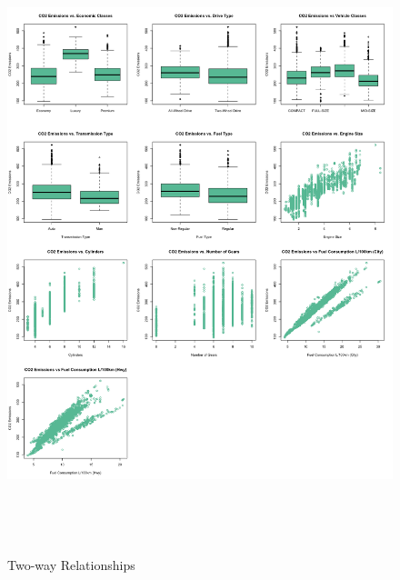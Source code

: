 \documentclass[11pt]{article}
\begin{document}
\begin{figure}[ht!]
\centering
\includegraphics[height = 180mm, width=160mm]{two_way_EDA.png}
\caption{Two-way Relationships }
\end{figure}
\end{document}
